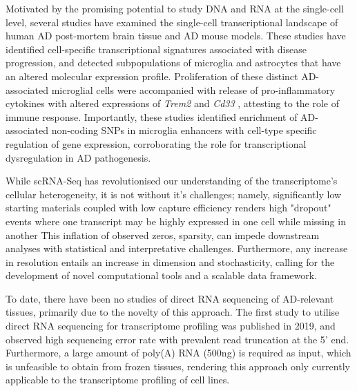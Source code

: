 Motivated by the promising potential to study DNA and RNA at the single-cell level, several studies have examined the single-cell transcriptional landscape of human AD post-mortem brain tissue\cite{Mathys2019,Nott2019,Thrupp2020,Olah2020,Leng2021,Young2021} and AD mouse models\cite{Keren-Shaul2017,Mathys2017}. These studies have identified cell-specific transcriptional signatures associated with disease progression, and detected subpopulations of microglia and astrocytes that have an altered molecular expression profile. Proliferation of these distinct AD-associated microglial cells were accompanied with release of pro-inflammatory cytokines\cite{Mathys2017} with altered expressions of \textit{Trem2} and \textit{Cd33} \cite{Mathys2019,Frigerio2019}, attesting to the role of immune response. Importantly, these studies identified enrichment of AD-associated non-coding SNPs in microglia enhancers with cell-type specific regulation of gene expression\cite{Tansey2018,Nott2019,Young2021,Novikova2021}, corroborating the role for transcriptional dysregulation in AD pathogenesis.   

While scRNA-Seq has revolutionised our understanding of the transcriptome's cellular heterogeneity, it is not without it's challenges; namely, significantly low starting materials coupled with low capture efficiency renders high "dropout" events where one transcript may be highly expressed in one cell while missing in another\cite{Lahnemann2020,Adil2021} This inflation of observed zeros, sparsity, can impede downstream analyses with statistical and interpretative challenges\cite{Adil2021}. Furthermore, any increase in resolution entails an increase in dimension and stochasticity, calling for the development of novel computational tools and a scalable data framework\cite{Lahnemann2020}. 

\newpage
{}
To date, there have been no studies of direct RNA sequencing of AD-relevant tissues, primarily due to the novelty of this approach. The first study to utilise direct RNA sequencing for transcriptome profiling was published in 2019, and observed high sequencing error rate with prevalent read truncation at the 5' end\cite{Workman2019a}. Furthermore, a large amount of poly(A) RNA (500ng) is required as input, which is unfeasible to obtain from frozen tissues, rendering this approach only currently applicable to the transcriptome profiling of cell lines.      
  

